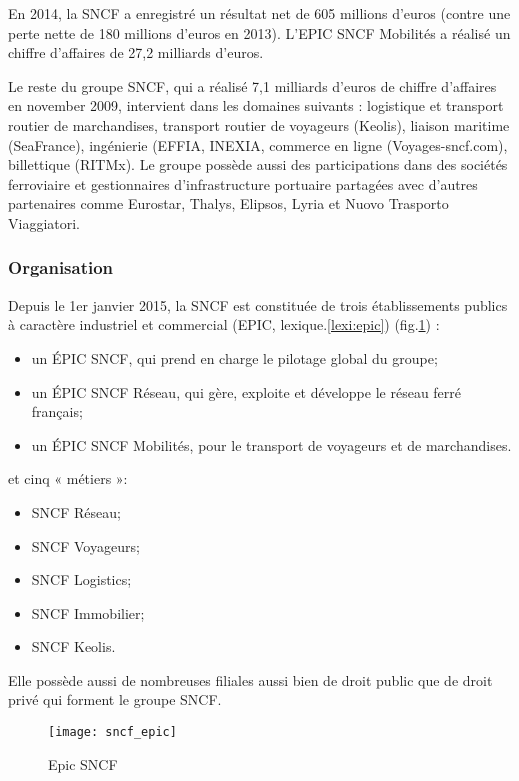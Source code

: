 En 2014, la SNCF a enregistré un résultat net de 605 millions d'euros (contre une perte nette de 180 millions d'euros en 2013). L'EPIC SNCF Mobilités a réalisé un chiffre d'affaires de 27,2 milliards d'euros.

Le reste du groupe SNCF, qui a réalisé 7,1 milliards d'euros de chiffre d'affaires en november 2009, intervient dans les domaines suivants : logistique et transport routier de marchandises, transport routier de voyageurs (Keolis), liaison maritime (SeaFrance), ingénierie (EFFIA, INEXIA, commerce en ligne (Voyages-sncf.com), billettique (RITMx). Le groupe possède aussi des participations dans des sociétés ferroviaire et gestionnaires d'infrastructure portuaire partagées avec d'autres partenaires comme Eurostar, Thalys, Elipsos, Lyria et Nuovo Trasporto Viaggiatori.

\subsubsection{Organisation}
Depuis le 1er janvier 2015,
la SNCF est constituée de trois établissements publics à caractère industriel et commercial (EPIC, lexique.\ref{lexi:epic}) (fig.\ref{fig:sncf_epic}) :
\begin{itemize}
 \item un ÉPIC SNCF, qui prend en charge le pilotage global du groupe;
 \item un ÉPIC SNCF Réseau, qui gère, exploite et développe le réseau ferré français;
 \item un ÉPIC SNCF Mobilités, pour le transport de voyageurs et de marchandises.
\end{itemize}
et cinq « métiers »:
\begin{itemize}
 \item SNCF Réseau;
 \item SNCF Voyageurs;
 \item SNCF Logistics;
 \item SNCF Immobilier;
 \item SNCF Keolis.
\end{itemize}

Elle possède aussi de nombreuses filiales aussi bien de droit public que de droit privé qui forment le groupe SNCF.

\begin{figure}[ht]
 \centering
 \texttt{[image: sncf\_epic]}
 \caption{Epic SNCF}
 \label{fig:sncf_epic}
\end{figure}

\clearpage

